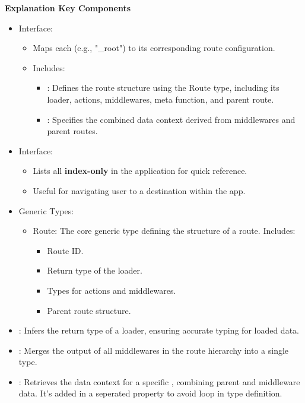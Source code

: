 \textbf{Explanation Key Components}
\begin{itemize}
  \item {} Interface:
  \begin{itemize}
    \item Maps each  (e.g., "\/\_root") to its corresponding route configuration.
    \item Includes:
    \begin{itemize}
      \item {}: Defines the route structure using the Route type, including its loader, actions, middlewares, meta function, and parent route.
      \item {}: Specifies the combined data context derived from middlewares and parent routes.
    \end{itemize}
  \end{itemize}

  \item {} Interface:
  \begin{itemize}
    \item Lists all \textbf{index-only}  in the application for quick reference.
    \item Useful for navigating user to a destination within the app.

  \end{itemize}

  \item Generic Types:
  \begin{itemize}
    \item Route: The core generic type defining the structure of a route. Includes:
    \begin{itemize}
      \item Route ID.
      \item  Return type of the loader.
      \item Types for actions and middlewares.
      \item Parent route structure.
    \end{itemize}
  \end{itemize}


  \item {}: Infers the return type of a loader, ensuring accurate typing for loaded data.
  \item {}: Merges the output of all middlewares in the route hierarchy into a single type.
  \item {}: Retrieves the data context for a specific , combining parent and middleware data. It's added in a seperated property to avoid loop in type definition.
\end{itemize}

